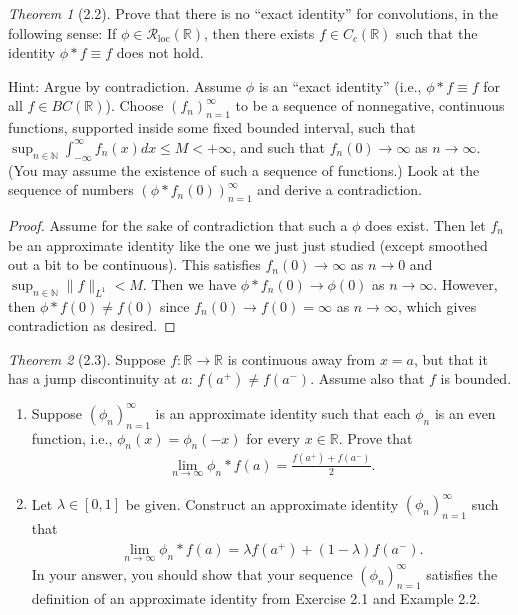 \documentclass[12pt]{article}
\theoremstyle{remark}
\theoremstyle{named}
\newtheorem*{theorem}{Theorem}
\newcommand{\N}{\mathbb N}
\newcommand{\R}{\mathbb R}
\newcommand{\Rloc}{\mathcal R_{\text{loc}}}
\begin{document}
\begin{theorem}[2.2]
    Prove that there is no ``exact identity'' for convolutions, in the following sense: If \(\phi \in \Rloc(\R)\), then there exists \(f \in C_c(\R)\) such that the identity \(\phi * f \equiv f\) does not hold.

    Hint: Argue by contradiction. Assume \(\phi\) is an ``exact identity'' (i.e., \(\phi * f \equiv f\) for all \(f \in BC(\R)\)). Choose \((f_n)_{n = 1}^\infty\) to be a sequence of nonnegative, continuous functions, supported inside some fixed bounded interval, such that \(\sup_{n \in \N}{\int_{-\infty}^{\infty} f_n(x) dx} \leq M < +\infty\), and such that \(f_n(0) \to \infty\) as \(n \to \infty\). (You may assume the existence of such a sequence of functions.) Look at the sequence of numbers \((\phi * f_n (0))_{n = 1}^\infty\) and derive a contradiction.
\end{theorem}

\begin{proof}
    Assume for the sake of contradiction that such a \(\phi\) does exist. Then let \(f_n\) be an approximate identity like the one we just just studied (except smoothed out a bit to be continuous). This satisfies \(f_n(0) \to \infty\) as \(n \to 0\) and \(\sup_{n \in \N} \|f\|_{L^1} < M\). Then we have \(\phi * f_n (0) \to \phi(0)\) as \(n \to \infty\). However, then \(\phi * f (0) \neq f (0)\) since \(f_n(0) \to f(0) = \infty\) as \(n \to \infty\), which gives contradiction as desired. 
\end{proof}

\begin{theorem}[2.3]
    Suppose \(f : \R \to \R\) is continuous away from \(x = a\), but that it has a jump discontinuity at \(a\): \(f(a^+) \neq f(a^-)\). Assume also that \(f\) is bounded. 
    \begin{enumerate}
        \item Suppose \((\phi_n)_{n = 1}^\infty\) is an approximate identity such that each \(\phi_n\) is an even function, i.e., \(\phi_n(x) = \phi_n(-x)\) for every \(x \in \R\). Prove that
        \begin{align*}
            \lim_{n \to \infty} \phi_n * f(a) = \frac{f(a^+) + f(a^-)}{2}.
        \end{align*}
        \item Let \(\lambda \in [0, 1]\) be given. Construct an approximate identity \((\phi_n)_{n = 1}^\infty\) such that 
        \begin{align*}
            \lim_{n \to \infty} \phi_n * f(a) = \lambda f(a^+) + (1 - \lambda) f(a^-).
        \end{align*}
        In your answer, you should show that your sequence \((\phi_n)_{n = 1}^\infty\) satisfies the definition of an approximate identity from Exercise 2.1 and Example 2.2.
    \end{enumerate}
\end{theorem}
\end{document}
